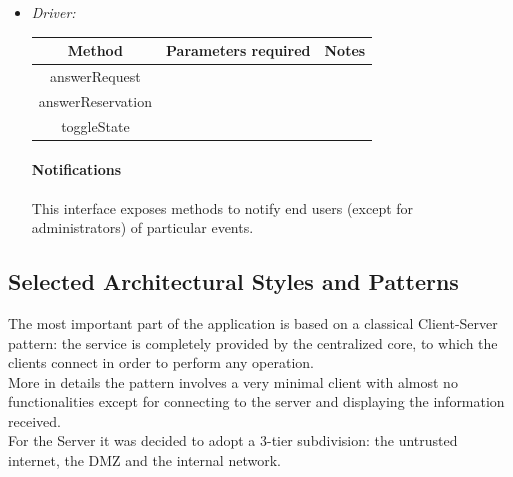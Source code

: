 \documentclass{article}
\begin{document}
\begin{itemize}
	\item \textit{Driver:}
		
	\begin{table}[H]
		\begin{adjustbox}{width=1.2\textwidth}
			\begin{tabular}{*{3}{c}}
				\toprule
				Method & Parameters required & Notes \\
				\midrule
				answerRequest & & \\ %
				answerReservation & & \\ %
				toggleState & & \\
				\bottomrule
			\end{tabular}
		\end{adjustbox}
	\end{table}
		

		
		\paragraph{Notifications}
		This interface exposes methods to notify end users (except for administrators) of particular events. 
		
		
		
\end{itemize}
\subsection{Selected Architectural Styles and Patterns}
The most important part of the application is based on a classical Client-Server pattern: the service is completely provided by the centralized core, to which the clients connect in order to perform any operation.\\
More in details the pattern involves a very minimal client with almost no functionalities except for connecting to the server and displaying the information received.\\
For the Server it was decided to adopt a 3-tier subdivision: the untrusted internet, the DMZ and the internal network.
\end{document}
